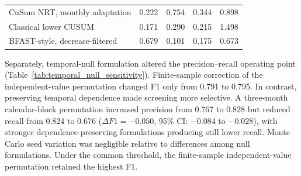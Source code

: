 \begin{table}[pos=!htbp]
\begin{tabular}{lcccc}
        CuSum NRT, monthly adaptation
        & 0.222
        & 0.754
        & 0.344
        & 0.898 \\

        Classical lower CUSUM
        & 0.171
        & 0.290
        & 0.215
        & 1.498 \\

        BFAST-style, decrease-filtered
        & 0.679
        & 0.101
        & 0.175
        & 0.673 \\

        \bottomrule
    \end{tabular}
\end{table}



Separately, temporal-null formulation altered the precision--recall operating point (Table~\ref{tab:temporal_null_sensitivity}). Finite-sample correction of the independent-value permutation changed F1 only from 0.791 to 0.795. In contrast, preserving temporal dependence made screening more selective. A three-month calendar-block permutation increased precision from 0.767 to 0.828 but reduced recall from 0.824 to 0.676 ($\Delta F1=-0.050$, 95\% CI: $-0.084$ to $-0.028$), with stronger dependence-preserving formulations producing still lower recall. Monte Carlo seed variation was negligible relative to differences among null formulations. Under the common threshold, the finite-sample independent-value permutation retained the highest F1.


